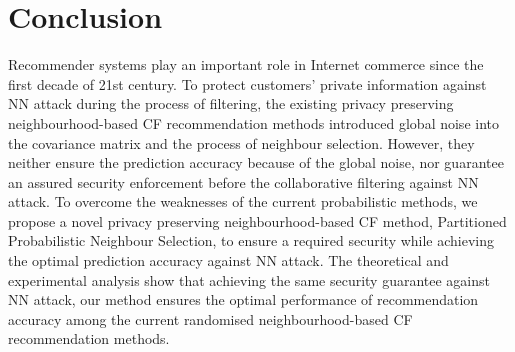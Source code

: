 \documentclass[11pt]{article}
\begin{document}
\section{Conclusion}
\label{CON}
Recommender systems play an important role in Internet commerce since the first decade of 21st century. To protect customers' private information against NN attack during the process of filtering, the existing privacy preserving neighbourhood-based CF recommendation methods \cite{MCSHERRY2009,ZHU2014,ADAMOPOULOS2014} introduced global noise into the covariance matrix and the process of neighbour selection. However, they neither ensure the prediction accuracy because of the global noise, nor guarantee an assured security enforcement before the collaborative filtering against NN attack. To overcome the weaknesses of the current probabilistic methods, we propose a novel privacy preserving neighbourhood-based CF method, Partitioned Probabilistic Neighbour Selection, to ensure a required security while achieving the optimal prediction accuracy against NN attack. The theoretical and experimental analysis show that achieving the same security guarantee against NN attack, our method ensures the optimal performance of recommendation accuracy among the current randomised neighbourhood-based CF recommendation methods.



 
\end{document}
